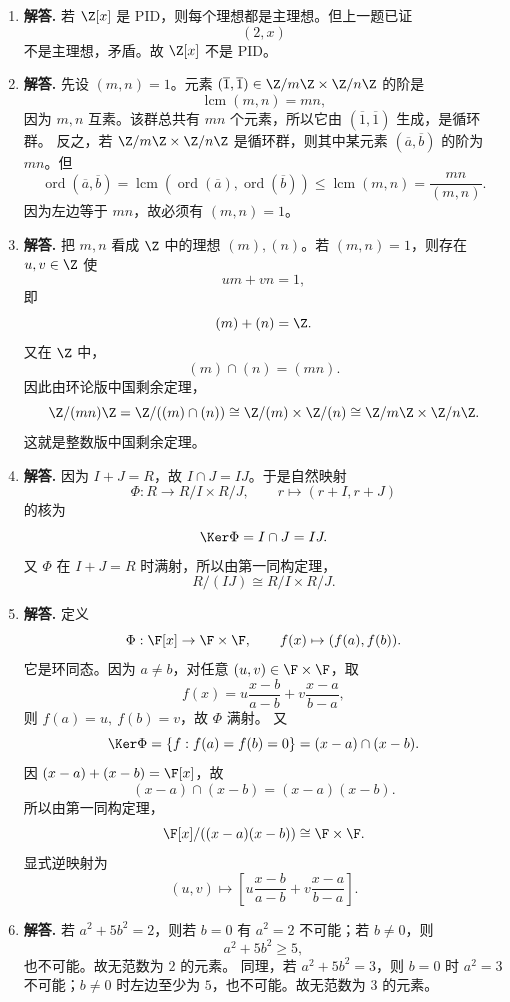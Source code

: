 \begin{enumerate}[label=\textbf{\arabic*.}, leftmargin=*, itemsep=1em]
  \item \textbf{解答.} 若 $\Z[x]$ 是 PID，则每个理想都是主理想。但上一题已证
  \[
  (2,x)
  \]
  不是主理想，矛盾。故 $\Z[x]$ 不是 PID。

  \item \textbf{解答.} 先设 $(m,n)=1$。元素 $(\overline1,\overline1)\in \Z/m\Z\times\Z/n\Z$ 的阶是
  \[
  \operatorname{lcm}(m,n)=mn,
  \]
  因为 $m,n$ 互素。该群总共有 $mn$ 个元素，所以它由 $(\overline1,\overline1)$ 生成，是循环群。  
  反之，若 $\Z/m\Z\times\Z/n\Z$ 是循环群，则其中某元素 $(\overline a,\overline b)$ 的阶为 $mn$。但
  \[
  \operatorname{ord}(\overline a,\overline b)=\operatorname{lcm}(\operatorname{ord}(\overline a),\operatorname{ord}(\overline b))
  \le \operatorname{lcm}(m,n)=\frac{mn}{(m,n)}.
  \]
  因为左边等于 $mn$，故必须有 $(m,n)=1$。

  \item \textbf{解答.} 把 $m,n$ 看成 $\Z$ 中的理想 $(m),(n)$。若 $(m,n)=1$，则存在 $u,v\in\Z$ 使
  \[
  um+vn=1,
  \]
  即
  \[
  (m)+(n)=\Z.
  \]
  又在 $\Z$ 中，
  \[
  (m)\cap(n)=(mn).
  \]
  因此由环论版中国剩余定理，
  \[
  \Z/(mn)\Z=\Z/((m)\cap(n))\cong \Z/(m)\times \Z/(n)\cong \Z/m\Z\times \Z/n\Z.
  \]
  这就是整数版中国剩余定理。

  \item \textbf{解答.} 因为 $I+J=R$，故 $I\cap J=IJ$。于是自然映射
  \[
  \Phi:R\to R/I\times R/J,\qquad r\mapsto(r+I,r+J)
  \]
  的核为
  \[
  \Ker\Phi=I\cap J=IJ.
  \]
  又 $\Phi$ 在 $I+J=R$ 时满射，所以由第一同构定理，
  \[
  R/(IJ)\cong R/I\times R/J.
  \]

  \item \textbf{解答.} 定义
  \[
  \Phi:\F[x]\to \F\times \F,\qquad f(x)\mapsto (f(a),f(b)).
  \]
  它是环同态。因为 $a\neq b$，对任意 $(u,v)\in\F\times\F$，取
  \[
  f(x)=u\frac{x-b}{a-b}+v\frac{x-a}{b-a},
  \]
  则 $f(a)=u,\ f(b)=v$，故 $\Phi$ 满射。  
  又
  \[
  \Ker\Phi=\{f:f(a)=f(b)=0\}=(x-a)\cap(x-b).
  \]
  因 $(x-a)+(x-b)=\F[x]$，故
  \[
  (x-a)\cap(x-b)=(x-a)(x-b).
  \]
  所以由第一同构定理，
  \[
  \F[x]/((x-a)(x-b))\cong \F\times\F.
  \]
  显式逆映射为
  \[
  (u,v)\longmapsto
  \left[
  u\frac{x-b}{a-b}+v\frac{x-a}{b-a}
  \right].
  \]

  \item \textbf{解答.} 若 $a^2+5b^2=2$，则若 $b=0$ 有 $a^2=2$ 不可能；若 $b\neq0$，则
  \[
  a^2+5b^2\ge 5,
  \]
  也不可能。故无范数为 $2$ 的元素。  
  同理，若 $a^2+5b^2=3$，则 $b=0$ 时 $a^2=3$ 不可能；$b\neq0$ 时左边至少为 $5$，也不可能。故无范数为 $3$ 的元素。


\end{enumerate}
